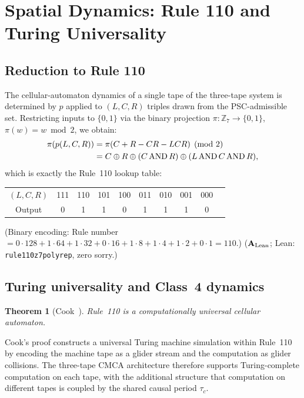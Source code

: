\documentclass[11pt]{article}
\newtheorem{theorem}{Theorem}[section]
\theoremstyle{remark}
\newcommand{\ZS}{\mathbb{Z}_7}
\newcommand{\lean}[1]{%
  \penalty-100
  \begingroup\def\_{\textunderscore\allowbreak}\texttt{#1}\endgroup}
\newcommand{\CatAL}{\ensuremath{\textbf{A}_{\rm Lean}}}
\begin{document}
\section{Spatial Dynamics: Rule 110 and Turing Universality}
\label{sec:dynamics}

\subsection{Reduction to Rule 110}
\label{ssec:rule110}

The cellular-automaton dynamics of a single tape of the three-tape system is
determined by $p$ applied to $(L,C,R)$ triples drawn from the PSC-admissible set.
Restricting inputs to $\{0,1\}$ via the binary projection $\pi:\ZS\to\{0,1\}$,
$\pi(w) = w\bmod 2$, we obtain:
\begin{align}
  \pi(p(L,C,R)) &= \pi(C+R-CR-LCR) \pmod 2 \notag\\
  &= C \oplus R \oplus (C\,\text{AND}\,R) \oplus (L\,\text{AND}\,C\,\text{AND}\,R),
\end{align}
which is exactly the Rule~110 lookup table:
\begin{center}
\begin{tabular}{cccccccccc}
\toprule
$(L,C,R)$ & 111 & 110 & 101 & 100 & 011 & 010 & 001 & 000\\
Output & 0 & 1 & 1 & 0 & 1 & 1 & 1 & 0\\
\bottomrule
\end{tabular}
\end{center}
(Binary encoding: Rule number $= 0\cdot128 + 1\cdot64 + 1\cdot32 + 0\cdot16 +
1\cdot8 + 1\cdot4 + 1\cdot2 + 0\cdot1 = 110$.)
($\CatAL$; Lean: \lean{rule110\_z7\_poly\_rep}, zero sorry.)

\subsection{Turing universality and Class~4 dynamics}
\label{ssec:turing}

\begin{theorem}[Cook~\cite{Cook2004}]
Rule~110 is a computationally universal cellular automaton.
\end{theorem}

Cook's proof constructs a universal Turing machine simulation within Rule~110
by encoding the machine tape as a glider stream and the computation as glider
collisions. The three-tape CMCA architecture therefore supports Turing-complete
computation on each tape, with the additional structure that computation on
different tapes is coupled by the shared causal period $\tau_c$.
\end{document}
